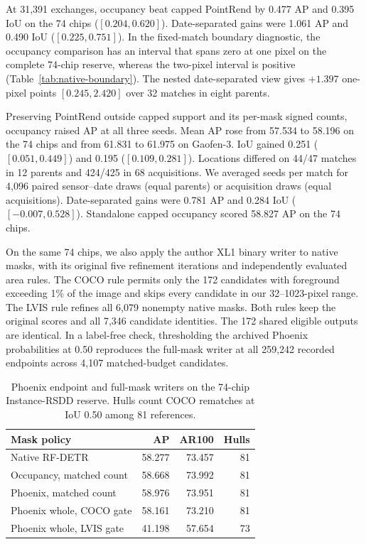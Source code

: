 \documentclass[journal]{IEEEtran}
\begin{document}
At 31,391 exchanges, occupancy beat capped PointRend by 0.477 AP and 0.395 IoU on the 74 chips (\([0.204,0.620]\)). Date-separated gains were 1.061 AP and 0.490 IoU (\([0.225,0.751]\)). In the fixed-match boundary diagnostic, the occupancy comparison has an interval that spans zero at one pixel on the complete 74-chip reserve, whereas the two-pixel interval is positive (Table~\ref{tab:native-boundary}). The nested date-separated view gives \(+1.397\) one-pixel points \([0.245,2.420]\) over 32 matches in eight parents.

Preserving PointRend outside capped support and its per-mask signed counts, occupancy raised AP at all three seeds. Mean AP rose from 57.534 to 58.196 on the 74 chips and from 61.831 to 61.975 on Gaofen-3. IoU gained 0.251 (\([0.051,0.449]\)) and 0.195 (\([0.109,0.281]\)). Locations differed on 44/47 matches in 12 parents and 424/425 in 68 acquisitions. We averaged seeds per match for 4,096 paired sensor--date draws (equal parents) or acquisition draws (equal acquisitions). Date-separated gains were 0.781 AP and 0.284 IoU (\([-0.007,0.528]\)). Standalone capped occupancy scored 58.827 AP on the 74 chips.

On the same 74 chips, we also apply the author XL1 binary writer to native masks, with its original five refinement iterations and independently evaluated area rules. The COCO rule permits only the 172 candidates with foreground exceeding 1\% of the image and skips every candidate in our 32--1023-pixel range. The LVIS rule refines all 6,079 nonempty native masks. Both rules keep the original scores and all 7,346 candidate identities. The 172 shared eligible outputs are identical. In a label-free check, thresholding the archived Phoenix probabilities at 0.50 reproduces the full-mask writer at all 259,242 recorded endpoints across 4,107 matched-budget candidates.

\begin{table}[t]
\centering
\caption{Phoenix endpoint and full-mask writers on the 74-chip Instance-RSDD reserve. Hulls count COCO rematches at IoU 0.50 among 81 references.}
\label{tab:phoenix-whole}
\footnotesize
\begin{tabular}{@{}lrrr@{}}
\toprule
Mask policy & AP & AR100 & Hulls\\
\midrule
Native RF-DETR & 58.277 & 73.457 & 81\\
Occupancy, matched count & 58.668 & 73.992 & 81\\
Phoenix, matched count & 58.976 & 73.951 & 81\\
Phoenix whole, COCO gate & 58.161 & 73.210 & 81\\
Phoenix whole, LVIS gate & 41.198 & 57.654 & 73\\
\bottomrule
\end{tabular}
\end{table}
\end{document}
